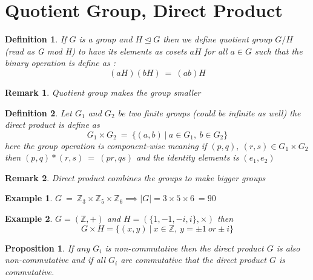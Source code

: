 \documentclass[12pt,a4paper]{article}
\newcommand{\Z}{\mathbb{Z}}
\newtheorem*{defn}{Definition}
\newtheorem*{rem}{Remark}
\newtheorem{ex}{Example}
\newtheorem*{prop}{Proposition}
\begin{document}
\section{Quotient Group, Direct Product}

\begin{defn}\normalfont
	If $G$ is a group and $H \trianglelefteq G$ then we define \textit{quotient group} $G/H$ (\textit{read as G mod H}) to have its elements as cosets $aH$ for all $a\in G$ such that the binary operation is define as :
	$$
		(aH)(bH) \:=\: (ab)H
	$$
\end{defn}
\begin{rem}
	Quotient group makes the group smaller
\end{rem}

\begin{defn}\normalfont
	Let $G_{1}$ and $G_{2}$ be two finite groups (\textit{could be infinite as well}) the direct product is define as 
	$$
		G_{1}\times G_{2} \:=\: \{ (a,b)\: |\: a\in G_{1},\: b\in G_{2}\}
	$$
	here the group operation is component-wise meaning if $(p,q),\: (r,s) \in G_{1}\times G_{2}$ then $(p,q)*(r,s)\:=\: (pr,qs)$ and the identity elements is $(e_{1},e_{2})$
\end{defn}
\begin{rem}
	Direct product combines the groups to make bigger groups
\end{rem}
\begin{ex}
	$G\:=\: \Z_{3}\times \Z_{5} \times \Z_{6} \implies |G| = 3\times5\times6\:=90$
\end{ex}
\begin{ex}
	$G=(\Z, +)$ and $H=(\{1,-1,-i,i\}, \times)$ then $$G\times H = \{ (x,y)\: |\: x\in \Z,\: y=\pm 1 \:or \pm i \}$$
\end{ex}

\begin{prop}\normalfont
	If any $G_{i}$ is non-commutative then the direct product $G$ is also non-commutative and if all $G_{i}$ are commutative that the direct product $G$ is commutative.
\end{prop}
\end{document}
